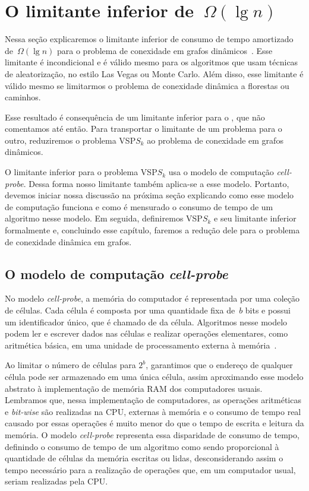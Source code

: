 \chapter{O limitante inferior de~$\Omega(\lg n)$}
\label{sec:lim}
Nessa seção explicaremos o limitante inferior de consumo de tempo amortizado de~$\Omega(\lg n)$ para o problema de conexidade em grafos dinâmicos~\cite{lowerBoundPatrascu}. Esse limitante é incondicional e é válido mesmo para os algoritmos que usam técnicas de aleatorização, no estilo Las Vegas ou Monte Carlo. Além disso, esse limitante é válido mesmo se limitarmos o problema de conexidade dinâmica a florestas ou caminhos. 

Esse resultado é consequência de um limitante inferior para o , que não comentamos até então. Para transportar o limitante de um problema para o outro, reduziremos o problema VSP$S_k$ ao problema de conexidade em grafos dinâmicos.

O limitante inferior para o problema VSP$S_k$ usa o modelo de computação \textit{cell-probe}. Dessa forma nosso limitante também aplica-se a esse modelo. Portanto, devemos iniciar nossa discussão na próxima seção explicando como esse modelo de computação funciona e como é mensurado o consumo de tempo de um algoritmo nesse modelo. Em seguida, definiremos VSP$S_k$ e seu limitante inferior formalmente e, concluindo esse capítulo, faremos a redução dele para o problema de conexidade dinâmica em grafos.

\section{O modelo de computação \textit{cell-probe}}
\label{sec:lim-cell-probe}
No modelo \textit{cell-probe}, a memória do computador é representada por uma coleção de células. Cada célula é composta por uma quantidade fixa de~$b$ bits e possui um identificador único, que é chamado de  da célula. Algoritmos nesse modelo podem ler e escrever dados nas células e realizar operações elementares, como aritmética básica, em uma unidade de processamento externa à memória~\cite{Ajtai1988}.

Ao limitar o número de células para $2^b$, garantimos que o endereço de qualquer célula pode ser armazenado em uma única célula, assim aproximando esse modelo abstrato à implementação de memória RAM dos computadores usuais. Lembramos que, nessa implementação de computadores, as operações aritméticas e \textit{bit-wise} são realizadas na CPU, externas à memória e o consumo de tempo real causado por essas operações é muito menor do que o tempo de escrita e leitura da memória. O modelo \textit{cell-probe} representa essa disparidade de consumo de tempo, definindo o consumo de tempo de um algoritmo como sendo proporcional à quantidade de células da memória escritas ou lidas, desconsiderando assim o tempo necessário para a realização de operações que, em um computador usual, seriam realizadas pela CPU.

